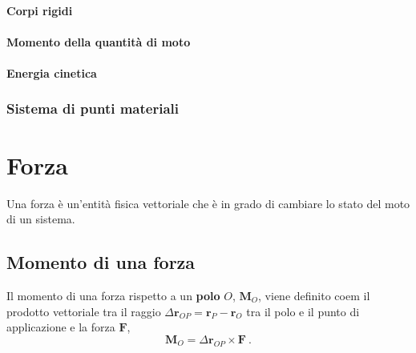 \subsubsection{Corpi rigidi}
\subsubsection{Momento della quantità di moto}
\subsubsection{Energia cinetica}

\subsection{Sistema di punti materiali}
\chapter{Forza}
\begin{definition}[Forza] Una forza è un'entità fisica vettoriale che è in grado di cambiare lo stato del moto di un sistema.
\end{definition}

\section{Momento di una forza}
\begin{definition} Il momento di una forza rispetto a un \textbf{polo} $O$, $\mathbf{M}_O$, viene definito coem il prodotto vettoriale tra il raggio $\Delta \mathbf{r}_{OP} = \mathbf{r}_P - \mathbf{r}_O$ tra il polo e il punto di applicazione e la forza $\mathbf{F}$,
    \begin{equation} \mathbf{M}_O = \Delta \mathbf{r}_{OP} \times \mathbf{F} \ .
    \end{equation}
\end{definition}

